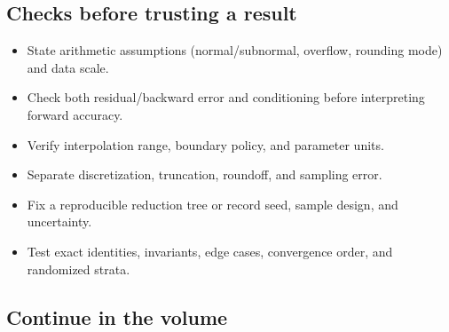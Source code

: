 \subsection{Checks before trusting a result}\label{appendix-cb5af353ef77-checks-before-trusting-a-result}

\begin{itemize}
\tightlist
\item
  State arithmetic assumptions (normal/subnormal, overflow, rounding mode) and data scale.
\item
  Check both residual/backward error and conditioning before interpreting forward accuracy.
\item
  Verify interpolation range, boundary policy, and parameter units.
\item
  Separate discretization, truncation, roundoff, and sampling error.
\item
  Fix a reproducible reduction tree or record seed, sample design, and uncertainty.
\item
  Test exact identities, invariants, edge cases, convergence order, and randomized strata.
\end{itemize}

\subsection{Continue in the volume}\label{appendix-cb5af353ef77-continue-in-the-volume}

